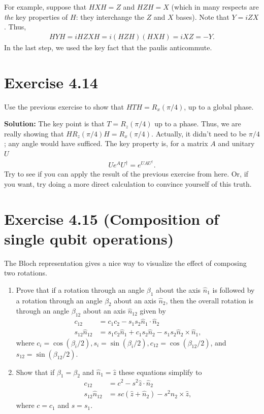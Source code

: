 \documentclass{book}
\begin{document}
    For example, suppose that $HXH = Z$ and $HZH = X$ (which in many respects are \emph{the} key properties of $H$: they interchange the $Z$ and $X$ bases). Note that $Y = i Z X$. Thus,
    \begin{align}
        HYH = i HZXH = i (HZH)(HXH) = i XZ = -Y.
    \end{align}
    In the last step, we used the key fact that the paulis anticommute. 

\section*{Exercise 4.14}
    Use the previous exercise to show that $HTH = R_x(\pi/4)$, up to a global phase.

    \textbf{Solution:} The key point is that $T = R_z(\pi/4)$ up to a phase. Thus, we are really showing that $H R_z (\pi/4) H = R_x(\pi/4)$. Actually, it didn't need to be $\pi/4$; any angle would have sufficed. The key property is, for a matrix $A$ and unitary $U$
    \begin{align}
        U e^{A} U^\dagger = e^{U A U^\dagger}.
    \end{align}
    Try to see if you can apply the result of the previous exercise from here. Or, if you want, try doing a more direct calculation to convince yourself of this truth. 

\section*{Exercise 4.15 (Composition of single qubit operations)}
    The Bloch representation gives a nice way to visualize the effect of composing two rotations.
    \begin{enumerate}
        \item Prove that if a rotation through an angle $\beta_1$ about the axis $\hat{n}_1$ is followed by a rotation through an angle $\beta_2$ about an axis $\hat{n}_2$, then the overall rotation is through an angle $\beta_{12}$ about an axis $\hat{n}_{12}$ given by
        \begin{align}
            c_{12} &= c_1 c_2 - s_1 s_2 \hat{n}_1 \cdot \hat{n}_2 \\
            s_{12} \hat{n}_{12} &= s_1 c_2 \hat{n}_1 + c_1 s_2 \hat{n}_2 - s_1 s_2 \hat{n}_2 \times \hat{n}_1,
        \end{align}
        where $c_i = \cos(\beta_i/2), s_i = \sin(\beta_i/2), c_{12} = \cos(\beta_{12}/2)$, and $s_{12} = \sin(\beta_{12}/2)$.
        \item Show that if $\beta_1 = \beta_2$ and $\hat{n}_1 = \hat{z}$ these equations simplify to
        \begin{align}
            c_{12} &= c^2 - s^2 \hat{z}\cdot \hat{n}_2 \\
            s_{12} \hat{n}_{12} &= sc(\hat{z} + \hat{n}_2) - s^2 \hat{n}_2 \times \hat{z},
        \end{align}
        where $c = c_1$ and $s = s_1$.
    \end{enumerate}
\end{document}
